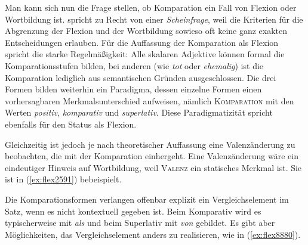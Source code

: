 \begin{exe}
  \ex \label{ex:flex2560}
  \begin{xlist}
  \end{xlist}
\end{exe}


Man kann sich nun die Frage stellen, ob Komparation ein Fall von Flexion oder Wortbildung ist.
\citet[177]{Eisenberg1} spricht zu Recht von einer \textit{Scheinfrage}, weil die Kriterien für die Abgrenzung der Flexion und der Wortbildung sowieso oft keine ganz exakten Entscheidungen erlauben.
Für die Auffassung der Komparation als Flexion spricht die starke Regelmäßigkeit:
Alle skalaren Adjektive können formal die Komparationsstufen bilden, bei anderen (wie \textit{tot} oder \textit{ehemalig}) ist die Komparation lediglich aus semantischen Gründen ausgeschlossen.
Die drei Formen bilden weiterhin ein Paradigma, dessen einzelne Formen einen vorhersagbaren Merkmalsunterschied aufweisen, nämlich \textsc{Komparation} mit den Werten \textit{positiv}, \textit{komparativ} und \textit{superlativ}.
Diese Paradigmatizität spricht ebenfalls für den Status als Flexion.

Gleichzeitig ist jedoch je nach theoretischer Auffassung eine Valenzänderung zu beobachten, die mit der Komparation einhergeht.
Eine Valenzänderung wäre ein eindeutiger Hinweis auf Wortbildung, weil \textsc{Valenz} ein statisches Merkmal ist.
Sie ist in (\ref{ex:flex2591}) bebeispielt.

\begin{exe}
  \ex \label{ex:flex2591}
  \begin{xlist}
  \end{xlist}
\end{exe}


Die Komparationsformen verlangen offenbar explizit ein Vergleichselement im Satz, wenn es nicht kontextuell gegeben ist.
Beim Komparativ wird es typischerweise mit \textit{als} und beim Superlativ mit \textit{von} gebildet.
Es gibt aber Möglichkeiten, das Vergleichselement anders zu realisieren, wie \zB in (\ref{ex:flex8880}).

